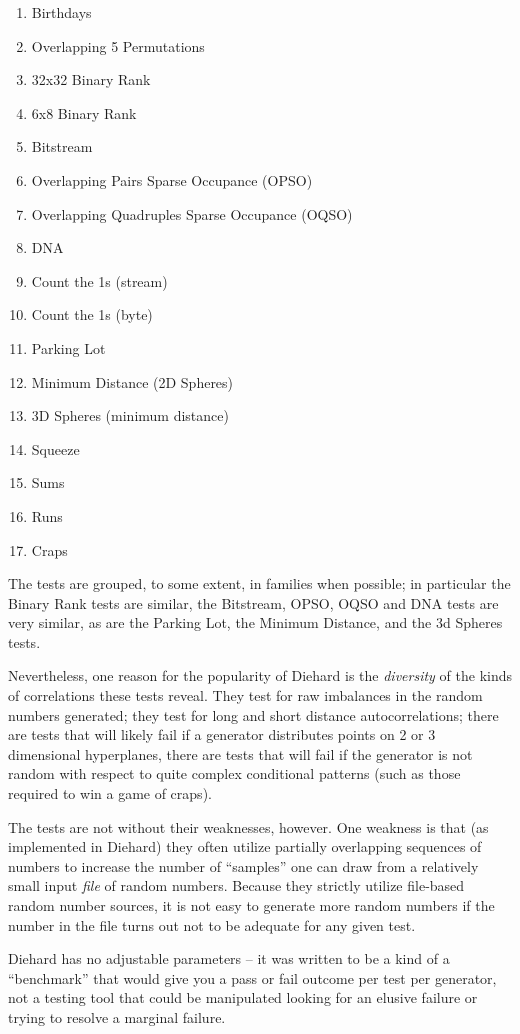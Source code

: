 \documentclass{book}
\begin{document}
\begin{enumerate}
 \item Birthdays 
 \item Overlapping 5 Permutations
 \item 32x32 Binary Rank 
 \item 6x8 Binary Rank 
 \item Bitstream 
 \item Overlapping Pairs Sparse Occupance (OPSO)
 \item Overlapping Quadruples Sparse Occupance (OQSO)
 \item DNA
 \item Count the 1s (stream) 
 \item Count the 1s (byte) 
 \item Parking Lot 
 \item Minimum Distance (2D Spheres) 
 \item 3D Spheres (minimum distance) 
 \item Squeeze 
 \item Sums 
 \item Runs 
 \item Craps
\end{enumerate} 
The tests are grouped, to some extent, in families when possible; in
particular the Binary Rank tests are similar, the Bitstream, OPSO, OQSO
and DNA tests are very similar, as are the Parking Lot, the Minimum
Distance, and the 3d Spheres tests.

Nevertheless, one reason for the popularity of Diehard is the {\em
diversity} of the kinds of correlations these tests reveal.  They test
for raw imbalances in the random numbers generated; they test for long
and short distance autocorrelations; there are tests that will likely
fail if a generator distributes points on 2 or 3 dimensional
hyperplanes, there are tests that will fail if the generator is not
random with respect to quite complex conditional patterns (such as those
required to win a game of craps).

The tests are not without their weaknesses, however.  One weakness is
that (as implemented in Diehard) they often utilize partially overlapping
sequences of numbers to increase the number of ``samples'' one can draw
from a relatively small input {\em file} of random numbers.  Because
they strictly utilize file-based random number sources, it is not easy
to generate more random numbers if the number in the file turns out not
to be adequate for any given test.  

Diehard has no adjustable parameters -- it was written to be a kind of a
``benchmark'' that would give you a pass or fail outcome per test per
generator, not a testing tool that could be manipulated looking for an
elusive failure or trying to resolve a marginal failure.
\end{document}
